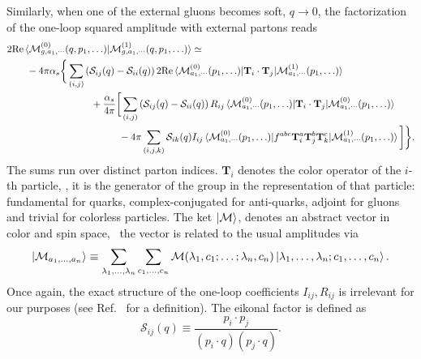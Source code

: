 Similarly, when one of the external gluons becomes soft, $q \rightarrow 0$, the factorization of the one-loop squared amplitude with external partons reads
\begin{equation}
\begin{split}
&2 \text{Re} \braket{\mathcal{M}^{(0)}_{g,a_1,\cdots} (q, p_1, \ldots)|\mathcal{M}^{(1)}_{g,a_1,\cdots} (q, p_1, \ldots)} \simeq \\
&\qquad - 4 \pi \alphas \bigg \lbrace \sum_{(i,j)} \left( \mathcal{S}_{ij}(q) - \mathcal{S}_{ii}(q) \right) 2 \text{Re} \braket{\mathcal{M}^{(0)}_{a_1,\cdots} ( p_1, \ldots)| \mathbf{T}_i \cdot \mathbf{T}_j|\mathcal{M}^{(1)}_{a_1,\cdots} (p_1, \ldots)}  \\
& \hspace{3cm} + \frac{\alphas}{4 \pi} \bigg [ \sum_{(i,j)} \left( \mathcal{S}_{ij}(q) - \mathcal{S}_{ii}(q) \right) R_{ij} \braket{\mathcal{M}^{(0)}_{a_1,\cdots} ( p_1, \ldots)| \mathbf{T}_i \cdot \mathbf{T}_j|\mathcal{M}^{(0)}_{a_1,\cdots} (p_1, \ldots)}  \\
& \hspace{4cm}  - 4 \pi \sum_{(i,j,k)} \mathcal{S}_{ik} (q) I_{ij} \braket{\mathcal{M}^{(0)}_{a_1,\cdots} ( p_1, \ldots)| f^{abc} \mathbf{T}_i^a \mathbf{T}_j^b \mathbf{T}_k^c|\mathcal{M}^{(1)}_{a_1,\cdots} (p_1, \ldots)} \bigg ] \bigg \rbrace .
\end{split}
\label{eq:5:soft_limit}
\end{equation}
The sums run over distinct parton indices. $\mathbf{T}_i$ denotes the color operator of the $i$-th particle, \ie, it is the generator of the  group in the representation of that particle: fundamental for quarks, complex-conjugated for anti-quarks, adjoint for gluons and trivial for colorless particles. The ket $\ket{\mathcal{M}}$, denotes an abstract vector in color and spin space, \ie\ the vector is related to the usual amplitudes via
\begin{equation}
\ket{\mathcal{M}_{a_1,\ldots , a_n}} \equiv \sum_{\lambda_1, \ldots , \lambda_n} \sum_{c_1, \ldots , c_n} \mathcal{M} (\lambda_1, c_1; \ldots ; \lambda_n, c_n) \ket{\lambda_1, \ldots , \lambda_n ; c_1, \ldots , c_n}.
\end{equation}
Once again, the exact structure of the one-loop coefficients $I_{ij}, R_{ij}$ is irrelevant for our purposes (see Ref.~\cite{Czakon:2014oma} for a definition). The eikonal factor is defined as
\begin{equation}
\mathcal{S}_{ij}(q) \equiv \frac{p_i \cdot p_j}{(p_i \cdot q) (p_j \cdot q)}.
\end{equation}

